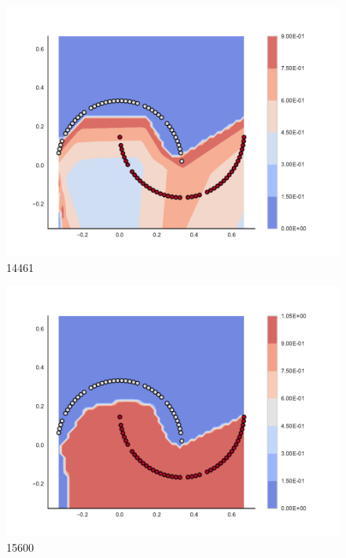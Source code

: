 \begin{subfigure}[b]{0.12\textwidth}
    \includegraphics[clip, trim=2.35cm 1.75cm 4.5cm 0cm,width=\textwidth]{img/convergence/14461.pdf}
    \caption{14461}
    \label{fig:convergence_14461}
\end{subfigure}
%
\begin{subfigure}[b]{0.12\textwidth}
    \includegraphics[clip, trim=2.35cm 1.75cm 4.5cm 0cm,width=\textwidth]{img/convergence/15600.pdf}
    \caption{15600}
    \label{fig:convergence_15600}
\end{subfigure}
%
